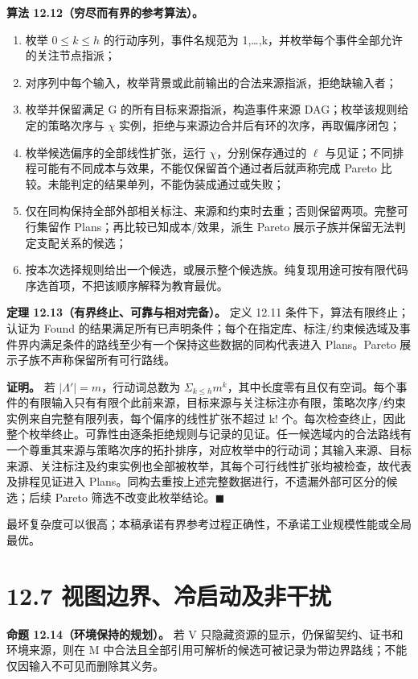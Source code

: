\documentclass[UTF8,a4paper,zihao=-4,fontset=windows,openany]{ctexbook}
\begin{document}
\textbf{算法 12.12（穷尽而有界的参考算法）。}

\begin{enumerate}
\item 枚举 \(0\le k\le h\) 的行动序列，事件名规范为 1,…,k，并枚举每个事件全部允许的关注节点指派；
\item 对序列中每个输入，枚举背景或此前输出的合法来源指派，拒绝缺输入者；
\item 枚举并保留满足 G 的所有目标来源指派，构造事件来源 DAG；枚举该规则给定的策略次序与 \(\chi\) 实例，拒绝与来源边合并后有环的次序，再取偏序闭包；
\item 枚举候选偏序的全部线性扩张，运行 \(\chi\)，分别保存通过的 \(\ell\) 与见证；不同排程可能有不同成本与效果，不能仅保留首个通过者后就声称完成 Pareto 比较。未能判定的结果单列，不能伪装成通过或失败；
\item 仅在同构保持全部外部相关标注、来源和约束时去重；否则保留两项。完整可行集留作 Plans；再比较已知成本/效果，派生 Pareto 展示子族并保留无法判定支配关系的候选；
\item 按本次选择规则给出一个候选，或展示整个候选族。纯复现用途可按有限代码序选首项，不把该顺序解释为教育最优。
\end{enumerate}
\textbf{定理 12.13（有界终止、可靠与相对完备）。} 定义 12.11 条件下，算法有限终止；认证为 Found 的结果满足所有已声明条件；每个在指定库、标注/约束候选域及事件界内满足条件的路线至少有一个保持这些数据的同构代表进入 Plans。Pareto 展示子族不声称保留所有可行路线。

\textbf{证明。} 若 \(|\Lambda'|=m\)，行动词总数为 \(\Sigma_{k\le h}m^k\)，其中长度零有且仅有空词。每个事件的有限输入只有有限个此前来源，目标来源与关注标注亦有限，策略次序/约束实例来自完整有限列表，每个偏序的线性扩张不超过 k! 个。每次检查终止，因此整个枚举终止。可靠性由逐条拒绝规则与记录的见证。任一候选域内的合法路线有一个尊重其来源与策略次序的拓扑排序，对应枚举中的行动词；其输入来源、目标来源、关注标注及约束实例也全部被枚举，其每个可行线性扩张均被检查，故代表及排程见证进入 Plans。同构去重按上述完整数据进行，不遗漏外部可区分的候选；后续 Pareto 筛选不改变此枚举结论。\(\blacksquare\)

最坏复杂度可以很高；本稿承诺有界参考过程正确性，不承诺工业规模性能或全局最优。

\section{12.7 视图边界、冷启动及非干扰}
\textbf{命题 12.14（环境保持的规划）。} 若 V 只隐藏资源的显示，仍保留契约、证书和环境来源，则在 M 中合法且全部引用可解析的候选可被记录为带边界路线；不能仅因输入不可见而删除其义务。
\end{document}
